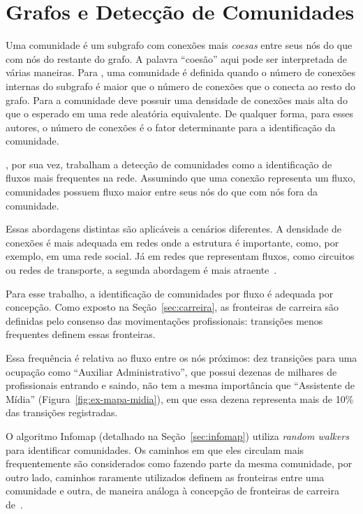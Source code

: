 \documentclass[
  article,
  11pt,
  a4paper,
  english,
  brazil,
  sumario=tradicional]{abntex2}
\begin{document}
\section{Grafos e Detecção de Comunidades} \label{sec:comunidades}

Uma comunidade é um subgrafo com conexões mais \textit{coesas} entre seus nós do que com nós do restante do grafo. A palavra \enquote{coesão} aqui pode ser interpretada de várias maneiras. Para , uma comunidade é definida quando o número de conexões internas do subgrafo é maior que o número de conexões que o conecta ao resto do grafo. Para  a comunidade deve possuir uma densidade de conexões mais alta do que o esperado em uma rede aleatória equivalente. De qualquer forma, para esses autores, o número de conexões é o fator determinante para a identificação da comunidade.

, por sua vez, trabalham a detecção de comunidades como a identificação de fluxos mais frequentes na rede. Assumindo que uma conexão representa um fluxo, comunidades possuem fluxo maior entre seus nós do que com nós fora da comunidade.

Essas abordagens distintas são aplicáveis a cenários diferentes. A densidade de conexões é mais adequada em redes onde a estrutura é importante, como, por exemplo, em uma rede social. Já em redes que representam fluxos, como circuitos ou redes de transporte, a segunda abordagem é mais atraente~\cite{Rosvall2009-sd}.

Para esse trabalho, a identificação de comunidades por fluxo é adequada por concepção. Como exposto na Seção~\ref{sec:carreira}, as fronteiras de carreira são definidas pelo consenso das movimentações profissionais: transições menos frequentes definem essas fronteiras.

Essa frequência é relativa ao fluxo entre os nós próximos: dez transições para uma ocupação como \enquote{Auxiliar Administrativo}, que possui dezenas de milhares de profissionais entrando e saindo, não tem a mesma importância que \enquote{Assistente de Mídia} (Figura~\ref{fig:ex-mapa-midia}), em que essa dezena representa mais de 10\% das transições registradas.

O algoritmo Infomap (detalhado na Seção~\ref{sec:infomap}) utiliza \textit{random walkers} para identificar comunidades. Os caminhos em que eles circulam mais frequentemente são considerados como fazendo parte da mesma comunidade, por outro lado, caminhos raramente utilizados definem as fronteiras entre uma comunidade e outra, de maneira análoga à concepção de fronteiras de carreira de~.
\end{document}
